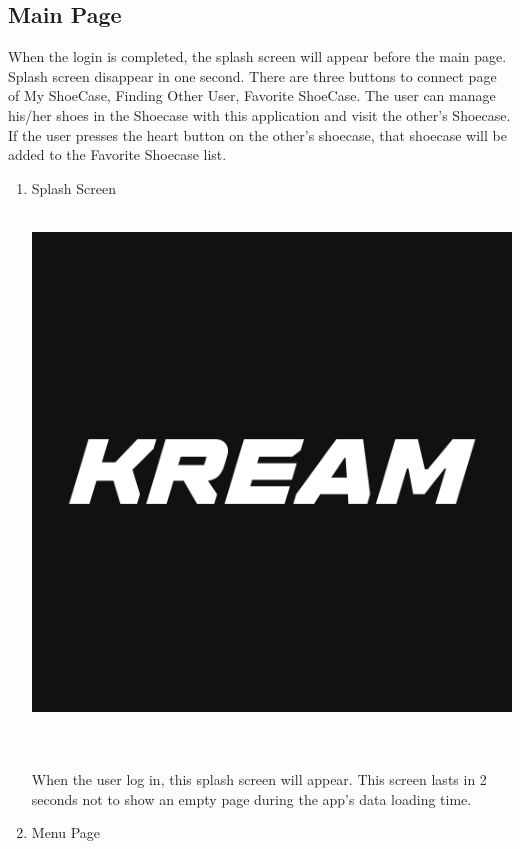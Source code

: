 \documentclass[conference]{IEEEtran}
\begin{document}
\subsection{Main Page}
When the login is completed, the splash screen will appear before the main page. Splash screen disappear in one second. There are three buttons to connect page of My ShoeCase, Finding Other User, Favorite ShoeCase. The user can manage his/her shoes in the Shoecase with this application and visit the other’s Shoecase. If the user presses the heart button on the other’s shoecase, that shoecase will be added to the Favorite Shoecase list.\\
\begin{enumerate}
	\item Splash Screen\\\\
\centerline{\includegraphics[scale=0.2]{pics/KREAM.png}}\\
\\When the user log in, this splash screen will appear. This screen lasts in 2 seconds not to show an empty page during the app’s data loading time.\\
	\item Menu Page\\\\

\end{enumerate}
\end{document}
